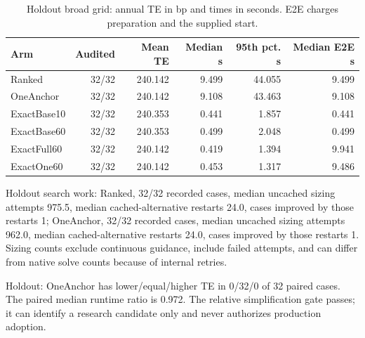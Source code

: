 \begin{table}[htbp]\centering\small\setlength{\tabcolsep}{4pt}

\caption{Holdout broad grid: annual TE in bp and times in seconds. E2E charges preparation and the supplied start.}

\begin{tabular}{lrrrrr}\toprule

Arm & Audited & Mean TE & Median s & 95th pct. s & Median E2E s\\\midrule

Ranked & 32/32 & 240.142 & 9.499 & 44.055 & 9.499\\

OneAnchor & 32/32 & 240.142 & 9.108 & 43.463 & 9.108\\

ExactBase10 & 32/32 & 240.353 & 0.441 & 1.857 & 0.441\\

ExactBase60 & 32/32 & 240.353 & 0.499 & 2.048 & 0.499\\

ExactFull60 & 32/32 & 240.142 & 0.419 & 1.394 & 9.941\\

ExactOne60 & 32/32 & 240.142 & 0.453 & 1.317 & 9.486\\

\bottomrule\end{tabular}\end{table}

Holdout search work: Ranked, 32/32 recorded cases, median uncached sizing attempts 975.5, median cached-alternative restarts 24.0, cases improved by those restarts 1; OneAnchor, 32/32 recorded cases, median uncached sizing attempts 962.0, median cached-alternative restarts 24.0, cases improved by those restarts 1. Sizing counts exclude continuous guidance, include failed attempts, and can differ from native solve counts because of internal retries.

Holdout: OneAnchor has lower/equal/higher TE in 0/32/0 of 32 paired cases. The paired median runtime ratio is 0.972. The relative simplification gate passes; it can identify a research candidate only and never authorizes production adoption.

